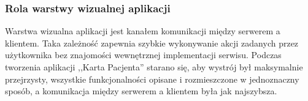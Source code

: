 \subsubsection{Rola warstwy wizualnej aplikacji}
Warstwa wizualna aplikacji jest kanałem komunikacji między serwerem a klientem. Taka zależność zapewnia szybkie wykonywanie akcji
zadanych przez użytkownika bez znajomości wewnętrznej implementacji serwisu.
Podczas tworzenia aplikacji ,,Karta Pacjenta'' starano się, aby wystrój był maksymalnie przejrzysty,
wszystkie funkcjonalności opisane i rozmieszczone w jednoznaczny sposób, a komunikacja między serwerem a klientem była jak najszybsza.